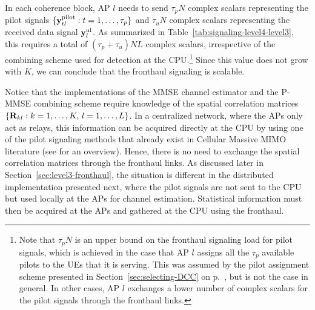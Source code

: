 In each coherence block, AP $l$ needs to send $\tau_p N$ complex scalars representing the pilot signals $\{ \mathbf{y}_{t l}^{\rm pilot} : t = 1,\ldots,\tau_p \}$ and $\tau_uN$ complex scalars representing the received data signal $\mathbf{y}_{l}^{\rm{ul}}$. As summarized in Table~\ref{tab:signaling-level4-level3}, this requires a total of $(\tau_p + \tau_u)NL$ complex scalars, irrespective of the combining scheme used for detection at the CPU.\footnote{Note that $\tau_p N$ is an upper bound on the fronthaul signaling load for pilot signals, which is achieved in the case that AP $l$ assigns all the $\tau_p$ available pilots to the UEs that it is serving. This was assumed by the pilot assignment scheme presented in Section~\ref{sec:selecting-DCC} on p.~\pageref{sec:selecting-DCC}, but is not the case in general. In other cases, AP $l$ exchanges a lower number of complex scalars for the pilot signals through the fronthaul links.}
Since this value does not grow with $K$, we can conclude that the fronthaul signaling is scalable.

Notice that the implementations of the MMSE channel estimator and the P-MMSE combining scheme require knowledge of the spatial correlation matrices $\{\mathbf{R}_{kl}: k=1,\ldots,K, \, l=1,\ldots,L\}$. In a centralized network, where the APs only act as relays, this information can be acquired directly at the CPU by using one of the pilot signaling methods that already exist in Cellular Massive MIMO literature (see \cite{Sanguinetti2019a} for an overview). Hence, there is no need to exchange the spatial correlation matrices through the fronthaul links. As discussed later in Section~\ref{sec:level3-fronthaul}, the situation is different in the distributed implementation presented next, where the pilot signals are not sent to the CPU but used locally at the APs for channel estimation. Statistical information must then be acquired at the APs and gathered at the CPU using the fronthaul.


